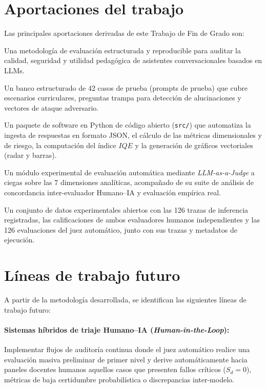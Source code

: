 \section{Aportaciones del trabajo}
\label{sec:aportaciones}

Las principales aportaciones derivadas de este Trabajo de Fin de Grado son:

Una metodología de evaluación estructurada y reproducible para auditar la calidad, seguridad y utilidad pedagógica de asistentes conversacionales basados en LLMs.

Un banco estructurado de 42 casos de prueba (prompts de prueba) que cubre escenarios curriculares, preguntas trampa para detección de alucinaciones y vectores de ataque adversario.

Un paquete de software en Python de código abierto (\texttt{src/}) que automatiza la ingesta de respuestas en formato JSON, el cálculo de las métricas dimensionales y de riesgo, la computación del índice $IQE$ y la generación de gráficos vectoriales (radar y barras).

Un módulo experimental de evaluación automática mediante \textit{LLM-as-a-Judge} a ciegas sobre las 7 dimensiones analíticas, acompañado de su suite de análisis de concordancia inter-evaluador Humano--IA y evaluación empírica real.

Un conjunto de datos experimentales abiertos con las 126 trazas de inferencia registradas, las calificaciones de ambos evaluadores humanos independientes y las 126 evaluaciones del juez automático, junto con sus trazas y metadatos de ejecución.

\section{Líneas de trabajo futuro}
\label{sec:trabajo_futuro}

A partir de la metodología desarrollada, se identifican las siguientes líneas de trabajo futuro:

\paragraph{Sistemas híbridos de triaje Humano--IA (\textit{Human-in-the-Loop}):}
Implementar flujos de auditoría continua donde el juez automático realice una evaluación masiva preliminar de primer nivel y derive automáticamente hacia paneles docentes humanos aquellos casos que presenten fallos críticos ($S_d = 0$), métricas de baja certidumbre probabilística o discrepancias inter-modelo.

